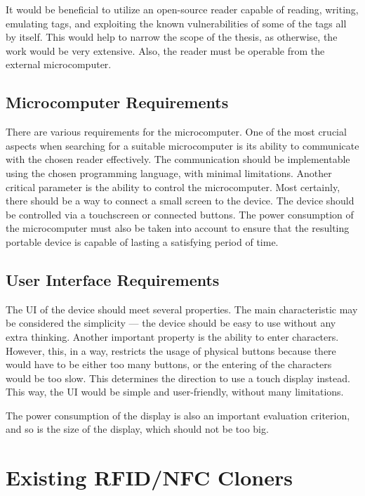 It would be beneficial to utilize an open-source reader capable of reading, writing, emulating tags, and exploiting the known vulnerabilities of some of the tags all by itself. This would help to narrow the scope of the thesis, as otherwise, the work would be very extensive. Also, the reader must be operable from the external microcomputer.

\subsection{Microcomputer Requirements}

There are various requirements for the microcomputer. One of the most crucial aspects when searching for a suitable microcomputer is its ability to communicate with the chosen reader effectively. The communication should be implementable using the chosen programming language, with minimal limitations. Another critical parameter is the ability to control the microcomputer. Most certainly, there should be a way to connect a small screen to the device. The device should be controlled via a touchscreen or connected buttons. The power consumption of the microcomputer must also be taken into account to ensure that the resulting portable device is capable of lasting a satisfying period of time.


\subsection{User Interface Requirements}

The UI of the device should meet several properties. The main characteristic may be considered the simplicity --- the device should be easy to use without any extra thinking. Another important property is the ability to enter characters. However, this, in a way, restricts the usage of physical buttons because there would have to be either too many buttons, or the entering of the characters would be too slow. This determines the direction to use a touch display instead. This way, the UI would be simple and user-friendly, without many limitations. 

The power consumption of the display is also an important evaluation criterion, and so is the size of the display, which should not be too big.


\section{Existing RFID/NFC Cloners}

